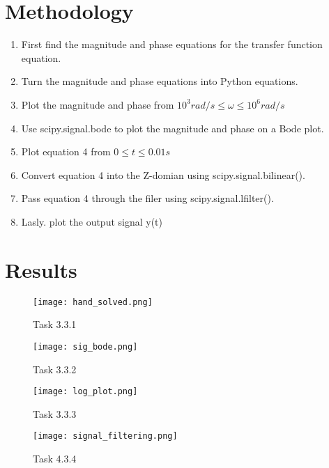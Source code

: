 \documentclass[12pt]{article}
\begin{document}
\section{Methodology}
\begin{enumerate}
    \item First find the magnitude and phase equations for the transfer function equation.
    \item Turn the magnitude and phase equations into Python equations.
    \item Plot the magnitude and phase from $10^3 rad/s \leq \omega \leq 10^6 rad/s$
    \item Use scipy.signal.bode to plot the magnitude and phase on a Bode plot.
    \item Plot equation 4 from $0\leq t \leq 0.01s$
    \item Convert equation 4 into the Z-domian using scipy.signal.bilinear().
    \item Pass equation 4 through the filer using scipy.signal.lfilter().
    \item Lasly. plot the output signal y(t)
\end{enumerate}

\section{Results}


\begin{figure}[H]
\caption{Task 3.3.1}
\centering
\texttt{[image: hand\_solved.png]}
\end{figure}

\begin{figure}[H]
\caption{Task 3.3.2}
\centering
\texttt{[image: sig\_bode.png]}
\end{figure}

\begin{figure}[H]
\caption{Task 3.3.3}
\centering
\texttt{[image: log\_plot.png]}
\end{figure}

\begin{figure}[H]
\caption{Task 4.3.4}
\centering
\texttt{[image: signal\_filtering.png]}
\end{figure}


\end{document}
